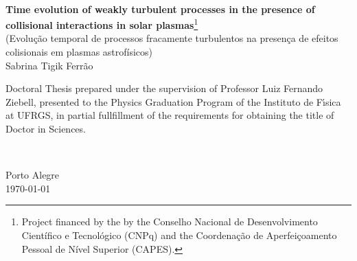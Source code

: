 \begin{titlepage}
  \begin{center}
  \\
\end{center}

\vspace{6cm}

\vfill
\begin{center}
\renewcommand{\thefootnote}{\fnsymbol{footnote}}
\setcounter{footnote}{2}
{\Large \sffamily \textbf{Time evolution of weakly turbulent processes in
    the presence of collisional interactions in solar plasmas}\footnote[1]{
    Project financed by the by the Conselho Nacional de
    Desenvolvimento Científico e Tecnológico (CNPq) and the
    Coordenação de Aperfeiçoamento Pessoal de Nível Superior (CAPES).}}\\
{\large \sffamily (Evolução temporal de processos fracamente turbulentos
  na presença de efeitos colisionais em plasmas astrofísicos)}\\
\vspace{1.5cm}
\Large Sabrina Tigik Ferrão\\
\end{center}
\vspace{3cm}
\vfill
\hfill
\parbox{.5\textwidth}{Doctoral Thesis prepared under the supervision of
  Professor Luiz Fernando Ziebell, presented to the Physics Graduation
  Program of the Instituto de F\'{\i}sica at UFRGS, in partial fullfillment
  of the requirements for obtaining the title of Doctor in Sciences.}\\
\vfill
\vspace{1cm}
\begin{center}
  { Porto Alegre\\ \today}
\vspace{0.5cm}
\renewcommand{\thefootnote}{\arabic{footnote}}
\end{center}

\end{titlepage}

